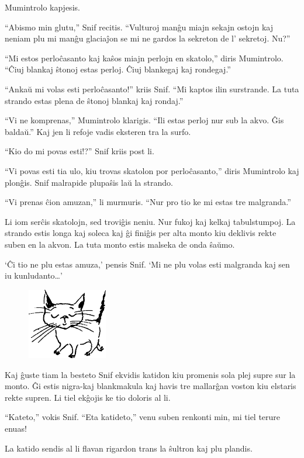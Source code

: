 Mumintrolo kapjesis.

``Abismo min glutu,'' Snif recitis. ``Vulturoj manĝu miajn sekajn ostojn kaj neniam plu mi manĝu glaciaĵon se mi ne gardos la sekreton de l' sekretoj. Nu?''

``Mi estos perloĉasanto kaj kaŝos miajn perlojn en skatolo,'' diris Mumintrolo. ``Ĉiuj blankaj ŝtonoj estas perloj. Ĉiuj blankegaj kaj rondegaj.''

``Ankaŭ mi volas esti perloĉasanto!'' kriis Snif. ``Mi kaptos ilin surstrande. La tuta strando estas plena de ŝtonoj blankaj kaj rondaj.''

``Vi ne komprenas,'' Mumintrolo klarigis. ``Ili estas perloj nur sub la akvo. Ĝis baldaŭ.'' Kaj jen li refoje vadis eksteren tra la surfo.

``Kio do mi povas esti!?'' Snif kriis post li.

``Vi povas esti tia ulo, kiu trovas skatolon por perloĉasanto,'' diris Mumintrolo kaj plonĝis. Snif malrapide plupaŝis laŭ la strando.

``Vi prenas ĉion amuzan,'' li murmuris. ``Nur pro tio ke mi estas tre malgranda.''

Li iom serĉis skatolojn, sed troviĝis neniu. Nur fukoj kaj kelkaj tabulstumpoj. La strando estis longa kaj soleca kaj ĝi finiĝis per alta monto kiu deklivis rekte suben en la akvon. La tuta monto estis malseka de onda ŝaŭmo.

`Ĉi tio ne plu estas amuza,' pensis Snif. `Mi ne plu volas esti malgranda kaj sen iu kunludanto{\ldots}'

\begin{figure}[htbp]
\centering
\includegraphics[width=100pt,height=88pt]{1-6.png}
\caption{}
\label{1-6}
\end{figure}

Kaj ĝuste tiam la besteto Snif ekvidis katidon kiu promenis sola plej supre sur la monto. Ĝi estis nigra-kaj blankmakula kaj havis tre mallarĝan voston kiu elstaris rekte supren. Li tiel ekĝojis ke tio doloris al li.

``Kateto,'' vokis Snif. ``Eta katideto,'' venu suben renkonti min, mi tiel terure enuas!

La katido sendis al li flavan rigardon trans la ŝultron kaj plu plandis.


